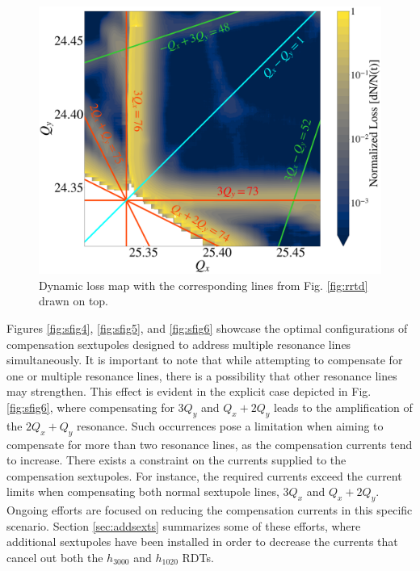 \begin{figure}[H]
    \centering
    \includegraphics[width=\columnwidth]{chapter4/bare_comments.png}
    \caption{Dynamic loss map with the corresponding lines from Fig. \ref{fig:rrtd} drawn on top.}
    \label{fig:bare_comments}
\end{figure}

Figures \ref{fig:sfig4}, \ref{fig:sfig5}, and \ref{fig:sfig6} showcase the optimal configurations of compensation sextupoles designed to address multiple resonance lines simultaneously. It is important to note that while attempting to compensate for one or multiple resonance lines, there is a possibility that other resonance lines may strengthen. This effect is evident in the explicit case depicted in Fig. \ref{fig:sfig6}, where compensating for $3Q_y$ and $Q_x+2Q_y$ leads to the amplification of the $2Q_x+Q_y$ resonance. Such occurrences pose a limitation when aiming to compensate for more than two resonance lines, as the compensation currents tend to increase. There exists a constraint on the currents supplied to the compensation sextupoles. For instance, the required currents exceed the current limits when compensating both normal sextupole lines, $3Q_x$ and $Q_x+2Q_y$. Ongoing efforts are focused on reducing the compensation currents in this specific scenario. Section \ref{sec:addsexts} summarizes some of these efforts, where additional sextupoles have been installed in order to decrease the currents that cancel out both the $h_{3000}$ and $h_{1020}$ RDTs.

